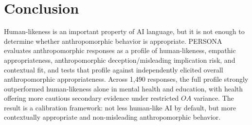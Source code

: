 \documentclass[manuscript,review,anonymous]{acmart}
\begin{document}
\section{Conclusion}
Human-likeness is an important property of AI language, but it is not enough to determine whether anthropomorphic behavior is appropriate. PERSONA evaluates anthropomorphic responses as a profile of human-likeness, empathic appropriateness, anthropomorphic deception/misleading implication risk, and contextual fit, and tests that profile against independently elicited overall anthropomorphic appropriateness. Across 1,490 responses, the full profile strongly outperformed human-likeness alone in mental health and education, with health offering more cautious secondary evidence under restricted $OA$ variance. The result is a calibration framework: not less human-like AI by default, but more contextually appropriate and non-misleading anthropomorphic behavior.



\end{document}
